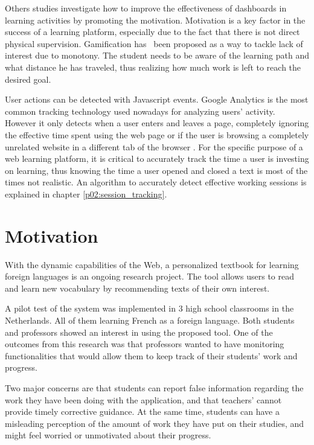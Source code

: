 Others studies investigate how to improve the effectiveness of dashboards in learning activities by promoting the motivation. Motivation is a key factor in the success of a learning platform, especially due to the fact that there is not direct physical supervision. Gamification \cite{Gonzalez2014} has \ been proposed as a way to tackle lack of interest due to monotony. The student needs to be aware of the learning path and what distance he has traveled, thus realizing how much work is left to reach the desired goal.

User actions can be detected with Javascript events. Google Analytics is the most common tracking technology used nowadays for analyzing users' activity. However it only detects when a user enters and leaves a page, completely ignoring the effective time spent using the web page or if the user is browsing a completely unrelated website in a different tab of the browser \cite{GoogleAnalytics01} \cite{MisunderstoodMetrics}. For the specific purpose of a web learning platform, it is critical to accurately track the time a user is investing on learning, thus knowing the time a user opened and closed a text is most of the times not realistic. An algorithm to accurately detect effective working sessions is explained in chapter \ref{p02:session_tracking}.

\section{Motivation}
With the dynamic capabilities of the Web, a personalized textbook for learning foreign languages \cite{Mircea2018} \cite{Lungu16} is an ongoing research project. The tool allows users to read and learn new vocabulary by recommending texts of their own interest. 

A pilot test of the system was implemented in 3 high school classrooms in the Netherlands. All of them learning French as a foreign language. Both students and professors showed an interest in using the proposed tool. One of the outcomes from this research was that professors wanted to have monitoring functionalities that would allow them to keep track of their students' work and progress.

Two major concerns are that students can report false information regarding the work they have been doing with the application, and that teachers' cannot provide timely corrective guidance. At the same time, students can have a misleading perception of the amount of work they have put on their studies, and might feel worried or unmotivated about their progress.

